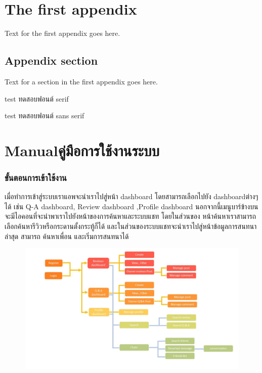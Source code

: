 \chapter{The first appendix}

Text for the first appendix goes here.

\section{Appendix section}

Text for a section in the first appendix goes here.

test ทดสอบฟอนต์ serif

\textsf{test ทดสอบฟอนต์ sans serif}

\ifenglish\else

\fi

\chapter{\ifenglish Manual\else คู่มือการใช้งานระบบ\fi}

\subsection{ขั้นตอนการเข้าใช้งาน }

เมื่อทำการเข้าสู่ระบบเราแอพจะนำเราไปสู่หน้า dashboard โดยสามารถเลือกไปยัง dashboardต่างๆได้ เช่น Q-A dashboard, Review
dashboard ,Profile dashboard นอกจากนี้เมนูบาร์ข้างบนจะมีไอคอนที่จะนำพาเราไปยังหน้าของการค้นหาและระบบแชท โดยในส่วนของ
หน้าค้นหาเราสามารถเลือกค้นหารีวิวหรือกระดานตั้งกระทู้ก็ได้ และในส่วนของระบบแชทจะนำเราไปสู่หน้าข้อมูลการสนทนาล่าสุด สามารถ
ค้นหาเพื่อน และเริ่มการสนทนาได้
 \begin{figure}[h]
\begin{center}
  \includegraphics[width=1\textwidth]{./image/reviews/howtouse.JPG}
\end{center}
\end{figure}